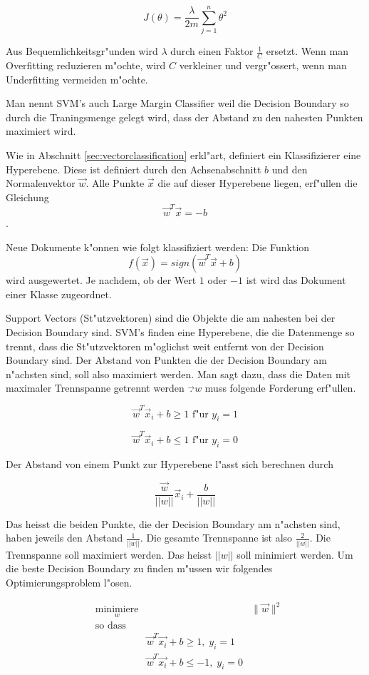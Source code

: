 \documentclass[12pt,a4paper,twoside]{article}
\begin{document}
\begin{equation}
  \label{eq:opt}
    J(\theta) = \frac{\lambda}{2m} \sum_{j=1}^n \theta^2
\end{equation}

Aus Bequemlichkeitsgr"unden wird $\lambda$ durch einen Faktor $\frac{1}{C}$ ersetzt. Wenn man Overfitting reduzieren m"ochte, wird $C$ verkleiner und vergr"ossert, wenn man Underfitting vermeiden m"ochte.

Man nennt SVM's auch Large Margin Classifier weil die Decision Boundary so durch die Traningsmenge gelegt wird, dass der Abstand zu den nahesten Punkten maximiert wird.

Wie in Abschnitt \ref{sec:vectorclassification} erkl"art, definiert ein Klassifizierer eine Hyperebene. Diese ist definiert durch den Achsenabschnitt $b$ und den Normalenvektor $ \vec w $. Alle Punkte $\vec x $ die auf dieser Hyperebene liegen, erf"ullen die Gleichung 
\[
\vec w^T \vec x = -b
\].

Neue Dokumente k"onnen wie folgt klassifiziert werden: Die Funktion
\[
f(\vec x ) = sign( \vec w^T \vec x + b)
\]
wird ausgewertet. Je nachdem, ob der Wert $1$ oder $-1$ ist wird das Dokument einer Klasse zugeordnet.

Support Vectors (St"utzvektoren) sind die Objekte die am nahesten bei der Decision Boundary sind. SVM's finden eine Hyperebene, die die Datenmenge so trennt, dass die St"utzvektoren m"oglichst weit entfernt von der Decision Boundary sind. Der Abstand von Punkten die der Decision Boundary am n"achsten sind, soll also  maximiert werden. Man sagt dazu, dass die Daten mit maximaler Trennspanne getrennt werden $\vec. w$ muss folgende Forderung erf"ullen.

\[
\vec w^T \vec x_i + b \geq 1 \text{ f"ur } y_i = 1
\]

\[
\vec w^T \vec x_i + b \leq 1 \text{ f"ur } y_i = 0
\]

Der Abstand von einem Punkt zur Hyperebene l"asst sich berechnen durch

\[
\frac{\vec w}{||w||} \vec x_i + \frac{b}{||w||}
\]

Das heisst die beiden Punkte, die der Decision Boundary am n"achsten sind, haben jeweils den Abstand $\frac{1}{||w||}$. Die gesamte Trennspanne ist also $\frac{2}{||w||}$. Die Trennspanne soll maximiert werden. Das heisst $||w||$ soll minimiert werden. Um die beste Decision Boundary zu finden m"ussen wir folgendes Optimierungsproblem l"osen.

 \begin{equation*}
   \label{eq:qp}
\begin{aligned}
& \underset{w}{\text{minimiere}}
& & \lVert \vec w \rVert^2 \\
& \text{so dass}\\
& & \vec{w}^T \vec{x_i} + b \geq 1, \; y_i = 1 \\
& & \vec{w}^T \vec{x_i} + b \leq -1, \;  y_i = 0
\end{aligned}
\end{equation*}
\end{document}
